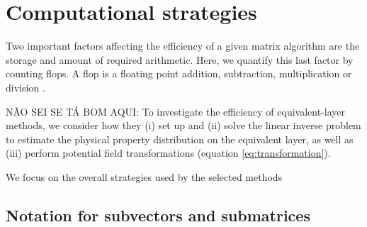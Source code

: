 

\section{Computational strategies}

Two important factors affecting the efficiency of a given matrix algorithm are the 
storage and amount of required arithmetic. Here, we quantify this last factor by counting flops.
A flop is a floating point addition, subtraction, multiplication or division \cite[][ p. 12--14]{golub-vanloan2013}.

NÃO SEI SE TÁ BOM AQUI: To investigate the efficiency of equivalent-layer methods, we consider how they
(i) set up and (ii) solve the linear inverse problem to estimate the physical property distribution on the equivalent layer, 
as well as (iii) perform potential field transformations (equation \ref{eq:transformation}).

We focus on the overall strategies used by the selected methods

\subsection{Notation for subvectors and submatrices}

